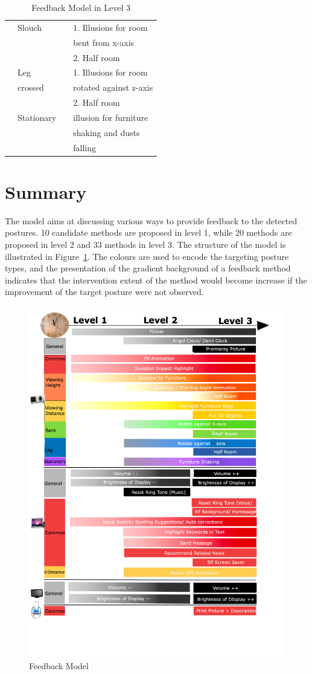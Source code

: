\begin{table}
\begin{tabular}{l l l l}
\hline
& Slouch & &1. Illusions for room\\
& & &  bent from x-axis\\
 & & & 2. Half room\\
\hline
& Leg && 1. Illusions for room\\
& crossed &&  rotated against z-axis\\
 & & & 2. Half room\\
\hline
& Stationary & & illusion for furniture\\
&&& shaking and dusts\\
&&& falling\\
\hline\hline
\end{tabular}
\caption{Feedback Model in Level 3}
\label{tab:feedback_model_lvl3}
\end{table}

\section{Summary}
The model aims at discussing various ways to provide feedback to the detected postures. 10 candidate methods are proposed in level 1, while 20 methods are proposed in level 2 and 33 methods in level 3. The structure of the model is illustrated in Figure~\ref{fig:feedback_model_2}. The colours are used to encode the targeting posture types, and the presentation of the gradient background of a feedback method indicates that the intervention extent of the method would become increase if the improvement of the target posture were not observed. 

\begin{figure}[h]
\centering
\includegraphics[width=1\textwidth]{figs/feedbackmodel2}
\caption{Feedback Model}
\label{fig:feedback_model_2}
\end{figure}
